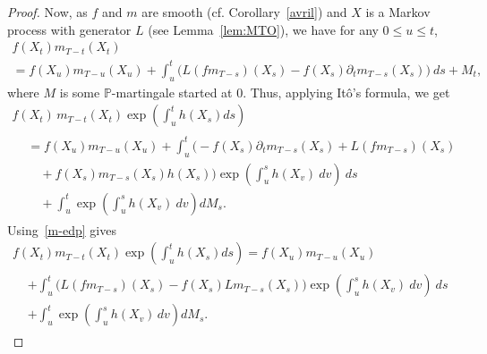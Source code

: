 \documentclass[AHL,Unicode,longabstracts,published]{cedram}
\renewcommand*\P{\mathbb{P}}
\begin{document}
\begin{proof}

\noindent Now, as $f$ and $m$ are smooth (cf. Corollary~\ref{avril}) and $X$ is a Markov process with generator $L$ (see Lemma~\ref{lem:MTO}), we have for any $0\le u\le t$,
\begin{multline}\label{eq:thmeq2}
f\left(X_{t}\right)m_{T-t}\left(X_{t}\right)\\
=f\left(X_{u}\right)m_{T-u}\left(X_{u}\right)+\int_{u}^{t} \big(L\left(fm_{T-s}\right)\left(X_{s}\right) -f\left(X_{s}\right)\partial_{t}m_{T-s}\left(X_{s}\right)\big)\ ds+M_{t},
\end{multline}
where $M$ is some $\P$-martingale started at $0$. Thus, applying It\^o's formula, we get
\begin{multline*}
f\left(X_{t}\right)\, m_{T-t}\left(X_{t}\right)\exp\left(\int_{u}^{t}h\left(X_{s}\right)ds \right)\\
\begin{aligned}
&=f\left(X_{u}\right)m_{T-u}\left(X_{u}\right)+\int_{u}^{t}\Big(- f\left(X_{s}\right)\partial_{t}m_{T-s}\left(X_{s}\right)+L\left(fm_{T-s}\right)\left(X_{s}\right)\\
&\quad+f\left(X_{s}\right)m_{T-s}\left(X_{s}\right)h\left(X_{s}\right)\Big) \exp\left(\int_{u}^{s}h\left(X_{v}\right)\ dv \right)\ ds\\
&\quad+\int_{u}^{t}\exp\left(\int_{u}^{s}h\left(X_{v}\right)\ dv \right) dM_{s}.
\end{aligned}
\end{multline*}
Using~\eqref{m-edp} gives
\begin{multline*}
f\left(X_{t}\right)m_{T-t}\left(X_{t}\right)\exp\left(\int_{u}^{t}h\left(X_{s}\right)ds \right) =f\left(X_{u}\right)m_{T-u}\left(X_{u}\right)\\
\begin{aligned}
&+\int_{u}^{t}\big(L\left(fm_{T-s}\right)\left(X_{s}\right)-f\left(X_{s}\right)Lm_{T-s}\left(X_{s}\right)\big) \exp\left(\int_{u}^{s}h\left(X_{v}\right)\ dv \right)\ ds\\
&+\int_{u}^{t}\exp\left(\int_{u}^{s}h\left(X_{v}\right)\, dv \right) dM_{s}.
\end{aligned}
\end{multline*} 


\end{proof}
\end{document}
